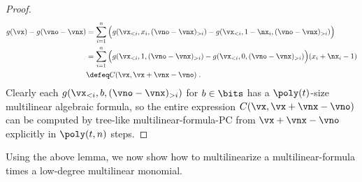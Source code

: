 \documentclass{toc}
\begin{document}
\begin{proof}
        \begin{align*}
                g(\vx)-g(\vno-\vnx)
                &=\sum_{i=1}^n \Big (g(\vx_{<i},x_i,(\vno-\vnx)_{>i}) - g(\vx_{<i},1-\nx_i,(\vno-\vnx)_{> i})\Big)\\
                &=\sum_{i=1}^n \Big(g(\vx_{<i},1,(\vno-\vnx)_{>i})-g(\vx_{<i},0,(\vno-\vnx)_{>i})\Big)(x_i+\nx_i-1)\\
                &\defeq C(\vx,\vx+\vnx-\vno)
                \;.
        \end{align*}
        Clearly each $g(\vx_{<i},b,(\vno-\vnx)_{>i})$ for $b\in\bits$ has a $\poly(t)$-size multilinear algebraic formula, so the entire expression $C(\vx,\vx+\vnx-\vno)$ can be computed by tree-like multilinear-formula-PC from $\vx+\vnx-\vno$ explicitly in $\poly(t,n)$ steps.
\end{proof}

Using the above lemma, we now show how to multilinearize a multilinear-formula times a low-degree multilinear monomial.
\end{document}
